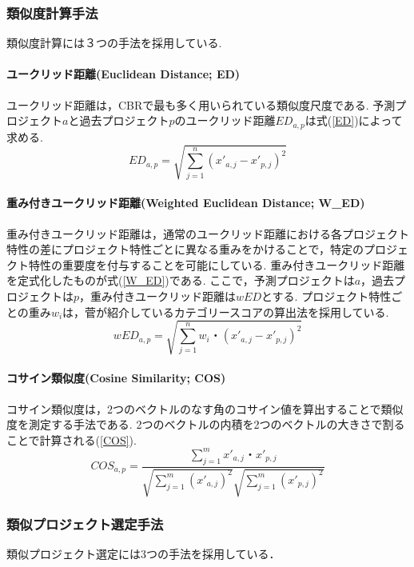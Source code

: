 \subsubsection{類似度計算手法}\label{Distance}
類似度計算には３つの手法を採用している.
\paragraph{ユークリッド距離(Euclidean Distance; ED) \quad \\}
ユークリッド距離\cite{Dejaeger2012}\cite{Shepperd1997}は，CBRで最も多く用いられている類似度尺度である.
予測プロジェクト$a$と過去プロジェクト$p$のユークリッド距離$ED_{a,p}$は式(\ref{ED})によって求める.
\begin{equation}
  \label{ED}
  ED_{a,p} = \sqrt{\sum_{j=1}^{n}(x'_{a,j} - x'_{p,j})^2}
\end{equation}
\paragraph{重み付きユークリッド距離(Weighted Euclidean Distance; W\_ED) \quad \\}
重み付きユークリッド距離は，通常のユークリッド距離における各プロジェクト特性の差にプロジェクト特性ごとに異なる重みをかけることで，特定のプロジェクト特性の重要度を付与することを可能にしている.
重み付きユークリッド距離を定式化したものが式(\ref{W_ED})である.
ここで，予測プロジェクトは$a$，過去プロジェクトは$p$，重み付きユークリッド距離は$wED$とする.
プロジェクト特性ごとの重み$w_i$は，菅\cite{菅2017}が紹介しているカテゴリースコアの算出法を採用している.
\begin{equation}
  \label{W_ED}
  wED_{a,p} = \sqrt{\sum_{j=1}^{n}w_i・(x'_{a,j} - x'_{p,j})^2}
\end{equation}
\paragraph{コサイン類似度(Cosine Similarity; COS) \quad \\}
コサイン類似度は，2つのベクトルのなす角のコサイン値を算出することで類似度を測定する手法である.
2つのベクトルの内積を2つのベクトルの大きさで割ることで計算される(\ref{COS}).
\begin{equation}
  \label{COS}
  COS_{a,p}=\frac{\sum_{j=1}^{m}x'_{a,j}・x'_{p,j}}{\sqrt{\sum_{j=1}^{m}(x'_{a,j})^2}\sqrt{\sum_{j=1}^{m}(x'_{p,j})^2}}
\end{equation}
\subsubsection{類似プロジェクト選定手法}\label{Selection}
類似プロジェクト選定には3つの手法を採用している．
